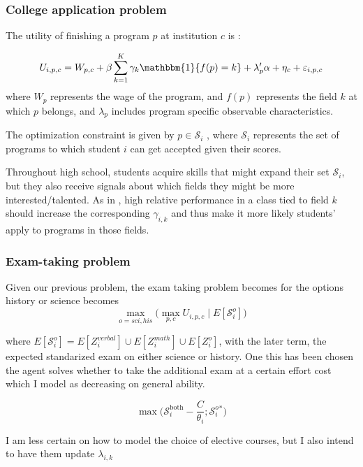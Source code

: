 \documentclass[12pt]{article}
\begin{document}
\subsubsection{College application problem} 

The  utility of finishing a program $p$ at institution $c$ is : 

\[ U_{i,p,c}= W_{p,c} + \beta \sum_{k=1}^K \gamma_k \mathbbm{1}\{f(p) =  k\} + \lambda_p' \alpha  + \eta_c + \varepsilon_{i,p,c}  \]
where $W_p$ represents the wage of the program, and  $f(p)$ represents the field $k$ at which $p$ belongs, and $\lambda_p$ includes program specific observable characteristics.

The optimization constraint is given by $p \in \mathcal{S}_i$ , where $\mathcal{S}_i$ represents the set of programs to which student $i$ can get accepted given their scores. 

Throughout high school, students acquire skills that might expand their set $ \mathcal{S}_i$, but they also receive signals about which fields they might be more interested/talented. As in \textcite{arcidiacono_ability_2004}, high relative performance in a class tied to field $k$ should increase the corresponding $\gamma_{i,k}$ and thus make it more likely students' apply to programs in those fields.

\subsubsection{Exam-taking problem}

Given our previous problem, the exam taking problem becomes for the options history or science becomes
\[ \max_{o = sci, his} \Big( \max_{p,c}    U_{i,p,c} \mid   E[  \mathcal {S}_i^o  ] \Big)  \]

where $E[  \mathcal {S}_i^o  ] = E[Z_i^{verbal}] \cup E[Z_i^{math}] \cup E[Z_i^o]$, with the later term, the expected standarized exam on either science or history. One this has been chosen the agent solves whether to take the additional exam at a certain effort cost which I model as decreasing on general ability.  

\[ \max \Big( \mathcal{S}_i^{\text{both}} - \frac{C }{\theta_i};  \mathcal{S}_i^o^*   \Big)  \]

I am less certain on how to model the choice of elective courses, but I also intend to have them update $\lambda_{i,k}$



\end{document}
